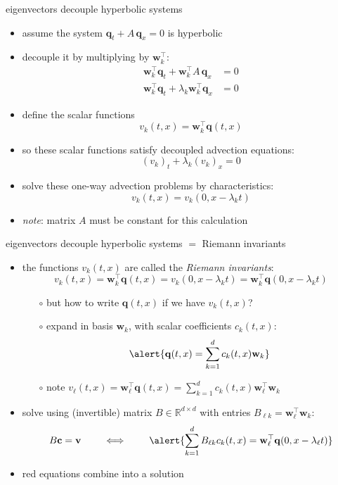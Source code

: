 \documentclass[10pt,dvipsnames,usepdftitle=false,
hyperref={pdftitle = {Finite volume methods},
    pdfauthor = {Ed Bueler}}]{beamer}
\newcommand{\bc}{\mathbf{c}}
\newcommand{\bq}{\mathbf{q}}
\newcommand{\bv}{\mathbf{v}}
\newcommand{\bw}{\mathbf{w}}
\newcommand{\RR}{\mathbb{R}}
\newcommand{\ds}{\displaystyle}
\begin{document}
\begin{frame}{eigenvectors decouple hyperbolic systems}

\begin{itemize}
\item assume the system $\bq_t + A\, \bq_x=0$ is hyperbolic
\item decouple it by multiplying by $\bw_k^\top$:
\begin{align*}
\bw_k^\top \bq_t + \bw_k^\top A\, \bq_x &= 0 \\
\bw_k^\top \bq_t + \lambda_k \bw_k^\top \bq_x &= 0
\end{align*}
\item define the scalar functions
    $$v_k(t,x) = \bw_k^\top \bq(t,x)$$
\item so these scalar functions satisfy decoupled advection equations:
   $$(v_k)_t + \lambda_k (v_k)_x = 0$$
\item solve these one-way advection problems by characteristics:
   $$v_k(t,x) = v_k(0,x-\lambda_k t)$$
\item \emph{note}: \alert{matrix $A$ must be constant for this calculation}
\end{itemize}
\end{frame}


\begin{frame}{eigenvectors decouple hyperbolic systems $=$ Riemann invariants}

\begin{itemize}
\item the functions $v_k(t,x)$ are called the \emph{Riemann invariants}:
    $$v_k(t,x) = \bw_k^\top \bq(t,x) = v_k(0,x-\lambda_k t) = \bw_k^\top \bq(0,x-\lambda_k t)$$

    \begin{itemize}
    \item[$\circ$] but how to write $\bq(t,x)$ if we have $v_k(t,x)$?
    \item[$\circ$] expand in basis $\bw_k$, with scalar coefficients $c_k(t,x)$:
    $$\alert{\bq(t,x) = \sum_{k=1}^d c_k(t,x) \bw_k}$$
    \item[$\circ$] note \qquad $\ds v_\ell(t,x) = \bw_\ell^\top \bq(t,x) = \sum_{k=1}^d c_k(t,x) \bw_\ell^\top \bw_k$
    \end{itemize}
\item solve using (invertible) matrix $B\in \RR^{d\times d}$ with entries \alert{$B_{\ell k} = \bw_\ell^\top \bw_k$}:
    $$B \bc = \bv \qquad \iff \qquad \alert{\sum_{k=1}^d B_{\ell k} c_k(t,x) = \bw_\ell^\top \bq(0,x-\lambda_\ell t)}$$
\item \alert{red equations} combine into a solution
\end{itemize}
\end{frame}
\end{document}
